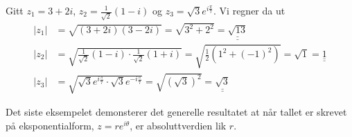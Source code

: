 \documentclass[a4paper,norsk,12pt]{article}
\newcommand{\ans}[1]{\underline{\underline{#1}}}
\newcounter{exa}
\begin{document}
\begin{texample}
Gitt $z_1 = 3 + 2i$, $z_2 = \frac{1}{\sqrt{2}}(1-i)$ og $z_3 = \sqrt{3}e^{i\frac{\pi}{7}}$. Vi regner da ut
\begin{align*}
	|z_1| &= \sqrt{(3+2i)(3-2i)} = \sqrt{3^2 + 2^2} = \ans{\sqrt{13}}\\[12pt]
	|z_2| &= \sqrt{\frac{1}{\sqrt{2}}(1-i)\cdot\frac{1}{\sqrt{2}}(1+i)} = \sqrt{\frac12 \left(1^2 + (-1)^2\right)} = \sqrt{1} = \ans{1}\\[12pt]
	|z_3| &= \sqrt{\sqrt{3}e^{i\frac{\pi}{7}}\cdot\sqrt{3}e^{-i\frac{\pi}{7}}} = \sqrt{(\sqrt{3})^2} = \ans{\sqrt{3}}
\end{align*}
\end{texample}
\noindent
Det siste eksempelet demonsterer det generelle resultatet at når tallet er skrevet på eksponentialform, $z=re^{i\theta}$, er absoluttverdien lik $r$.
\end{document}
